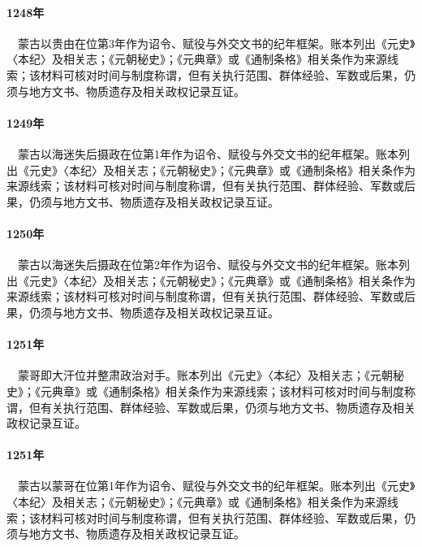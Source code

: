 \paragraph{1248年}　蒙古以贵由在位第3年作为诏令、赋役与外交文书的纪年框架。账本列出《元史》〈本纪〉及相关志；《元朝秘史》；《元典章》或《通制条格》相关条作为来源线索；该材料可核对时间与制度称谓，但有关执行范围、群体经验、军数或后果，仍须与地方文书、物质遗存及相关政权记录互证。

\paragraph{1249年}　蒙古以海迷失后摄政在位第1年作为诏令、赋役与外交文书的纪年框架。账本列出《元史》〈本纪〉及相关志；《元朝秘史》；《元典章》或《通制条格》相关条作为来源线索；该材料可核对时间与制度称谓，但有关执行范围、群体经验、军数或后果，仍须与地方文书、物质遗存及相关政权记录互证。

\paragraph{1250年}　蒙古以海迷失后摄政在位第2年作为诏令、赋役与外交文书的纪年框架。账本列出《元史》〈本纪〉及相关志；《元朝秘史》；《元典章》或《通制条格》相关条作为来源线索；该材料可核对时间与制度称谓，但有关执行范围、群体经验、军数或后果，仍须与地方文书、物质遗存及相关政权记录互证。

\paragraph{1251年}　蒙哥即大汗位并整肃政治对手。账本列出《元史》〈本纪〉及相关志；《元朝秘史》；《元典章》或《通制条格》相关条作为来源线索；该材料可核对时间与制度称谓，但有关执行范围、群体经验、军数或后果，仍须与地方文书、物质遗存及相关政权记录互证。

\paragraph{1251年}　蒙古以蒙哥在位第1年作为诏令、赋役与外交文书的纪年框架。账本列出《元史》〈本纪〉及相关志；《元朝秘史》；《元典章》或《通制条格》相关条作为来源线索；该材料可核对时间与制度称谓，但有关执行范围、群体经验、军数或后果，仍须与地方文书、物质遗存及相关政权记录互证。

